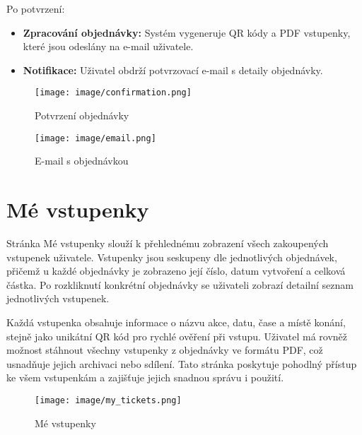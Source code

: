 \documentclass[12pt, a4paper,
twoside,        %
openright
]{report}
\begin{document}
	Po potvrzení:
	
	\begin{itemize}
		\item \textbf{Zpracování objednávky:} Systém vygeneruje QR kódy a PDF vstupenky, které jsou odeslány na e-mail uživatele.
		\item \textbf{Notifikace:} Uživatel obdrží potvrzovací e-mail s detaily objednávky.
	\end{itemize}
	
	\begin{figure}[h!]
		\centering %
		\texttt{[image: image/confirmation.png]} %
		\caption{Potvrzení objednávky} %
		\label{fig:confirmation} %
	\end{figure}
	
	\begin{figure}[h!]
		\centering %
		\texttt{[image: image/email.png]} %
		\caption{E-mail s objednávkou} %
		\label{fig:email} %
	\end{figure}
	
	\clearpage

	\section{Mé vstupenky}
	
	Stránka Mé vstupenky slouží k přehlednému zobrazení všech zakoupených vstupenek uživatele. Vstupenky jsou seskupeny dle jednotlivých objednávek, přičemž u každé objednávky je zobrazeno její číslo, datum vytvoření a celková částka. Po rozkliknutí konkrétní objednávky se uživateli zobrazí detailní seznam jednotlivých vstupenek.
	
	Každá vstupenka obsahuje informace o názvu akce, datu, čase a místě konání, stejně jako unikátní QR kód pro rychlé ověření při vstupu. Uživatel má rovněž možnost stáhnout všechny vstupenky z objednávky ve formátu PDF, což usnadňuje jejich archivaci nebo sdílení. \linebreak Tato stránka poskytuje pohodlný přístup ke všem vstupenkám a zajišťuje jejich snadnou správu i použití.
	
	\begin{figure}[h!]
		\centering %
		\texttt{[image: image/my\_tickets.png]} %
		\caption{Mé vstupenky} %
		\label{fig:mytickets} %
	\end{figure}
	
\end{document}
